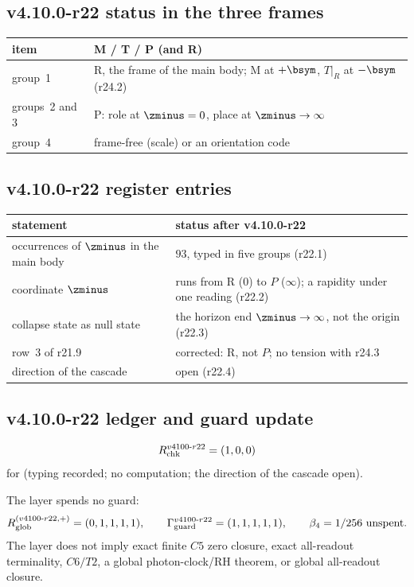 \subsection*{v4.10.0-r22 status in the three frames}
\label{subsec:v4100-r22-frames}

\begin{center}
\small
\begin{tabular}{@{}>{\raggedright\arraybackslash}p{}>{\raggedright\arraybackslash}p{}@{}}
\toprule
item & M / T / P (and R)\\
\midrule
group~1 & R, the frame of the main body; M at \(+\bsym\), \(T|_R\) at \(-\bsym\) (r24.2)\\
groups~2 and 3 & P: role at \(\zminus=0\), place at \(\zminus\to\infty\)\\
group~4 & frame-free (scale) or an orientation code\\
\bottomrule
\end{tabular}
\end{center}

\subsection*{v4.10.0-r22 register entries}
\label{subsec:v4100-r22-register}

\begin{center}
\small
\begin{tabular}{@{}>{\raggedright\arraybackslash}p{}>{\raggedright\arraybackslash}p{}@{}}
\toprule
statement & status after v4.10.0-r22\\
\midrule
occurrences of \(\zminus\) in the main body & \(93\), typed in five groups (r22.1)\\
coordinate \(\zminus\) & runs from R (\(0\)) to \(P\) (\(\infty\)); a rapidity under one reading (r22.2)\\
collapse state as null state & the horizon end \(\zminus\to\infty\), not the origin (r22.3)\\
row~3 of r21.9 & corrected: R, not \(P\); no tension with r24.3\\
direction of the cascade & open (r22.4)\\
\bottomrule
\end{tabular}
\end{center}

\subsection*{v4.10.0-r22 ledger and guard update}
\label{subsec:v4100-r22-ledger-guard}

\[
R_{\rm chk}^{v4100\text{-}r22}=(1,0,0)
\]
for (typing recorded; no computation; the direction of the cascade open).

The layer spends no guard:
\[
R_{\rm glob}^{(v4100\text{-}r22,+)}=(0,1,1,1,1),
\qquad
\Gamma_{\rm guard}^{v4100\text{-}r22}=(1,1,1,1,1),
\qquad
\beta_4=1/256\ \text{unspent}.
\]
The layer does not imply exact finite \(C5\) zero closure, exact all-readout terminality, \(C6/T2\), a global photon-clock/RH theorem,
or global all-readout closure.
